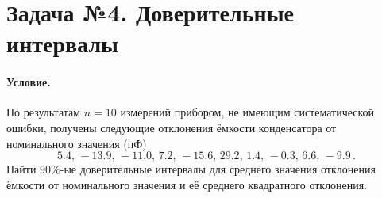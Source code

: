 
\section{Задача №4. Доверительные интервалы}

\paragraph{Условие.} По результатам $n = 10$ измерений прибором, не имеющим систематической ошибки, получены следующие отклонения ёмкости конденсатора от номинального значения (пФ)
\[
    5.4,\, -13.9,\, -11.0,\, 7.2,\, -15.6,\, 29.2,\, 1.4,\, -0.3,\, 6.6,\, -9.9\,.
\]
Найти $90\%$-ые доверительные интервалы для среднего значения отклонения ёмкости от номинального значения и её среднего квадратного отклонения.